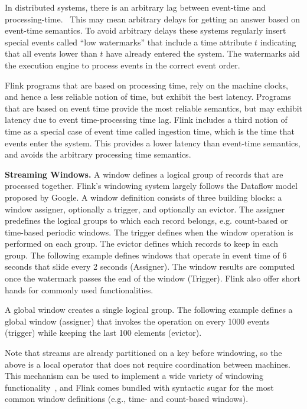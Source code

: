 \documentclass[11pt]{article}
\begin{document}
In distributed systems, there is an arbitrary lag between event-time and processing-time.~\cite{akidau2015dataflow} This may mean arbitrary delays for getting an answer based on event-time semantics. To avoid arbitrary delays these systems regularly insert special events called ``low watermarks''  that include a time attribute $t$ indicating that all events lower than $t$ have already entered the system. The watermarks aid the execution engine to process events in the correct event order. 

Flink programs that are based on processing time, rely on the machine clocks, and hence a less reliable notion of time, but exhibit the best latency. Programs that are based on event time provide the most reliable semantics, but may exhibit latency due to event time-processing time lag. Flink includes a third notion of time as a special case of event time called ingestion time, which is the time that events enter the system. This provides  a lower latency than event-time semantics, and avoids the arbitrary processing time semantics.

\textbf{Streaming Windows.} A window defines a logical group of records that are processed together. Flink's windowing system largely follows the Dataflow model~\cite{akidau2015dataflow} proposed by Google. A window definition consists of three building blocks: a window assigner, optionally a trigger, and optionally an evictor. 
The assigner predefines the logical groups to which each record belongs, e.g. count-based or time-based periodic windows. The trigger defines when the window operation is performed on each group. The evictor defines which records to keep in each group. The following example defines windows that operate in event time of 6 seconds that slide every 2 seconds (Assigner). The window results are computed once the watermark passes the end of the window (Trigger). Flink also offer short hands for commonly used functionalities.



A global window creates a single logical group. The following example defines a global window (assigner) that invokes the operation on every 1000 events (trigger) while keeping the last 100 elements (evictor). 



Note that streams are already partitioned on a key before windowing, so the above is a local operator that does not require coordination between machines. This mechanism can be used to implement a wide variety of windowing functionality~\cite{akidau2015dataflow}, and Flink comes bundled with syntactic sugar for the most common window definitions (e.g., time- and count-based windows). 
\end{document}
